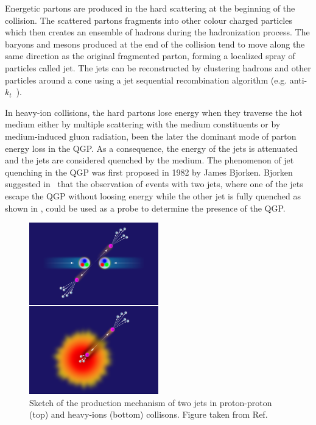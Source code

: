 Energetic partons are produced in the hard scattering at the beginning of the collision. The scattered partons fragments into other colour charged particles which then creates an ensemble of hadrons during the hadronization process. The baryons and mesons produced at the end of the collision tend to move along the same direction as the original fragmented parton, forming a localized spray of particles called jet. The jets can be reconstructed by clustering hadrons and other particles around a cone using a jet sequential recombination algorithm (e.g. anti-$k_{t}$~\cite{AntikT}).

In heavy-ion collisions, the hard partons lose energy when they traverse the hot medium either by multiple scattering with the medium constituents or by medium-induced gluon radiation, been the later the dominant mode of parton energy loss in the QGP. As a consequence, the energy of the jets is attenuated and the jets are considered quenched by the medium. The phenomenon of jet quenching in the QGP was first proposed in 1982 by James Bjorken. Bjorken suggested in~\cite{BjorkenJetQuenching} that the observation of events with two jets, where one of the jets escape the QGP without loosing energy while the other jet is fully quenched as shown in , could be used as a probe to determine the presence of the QGP.

\begin{figure}[!htbp]
 \begin{center}
  \includegraphics[width=0.5\textwidth]{Figures/Introduction/HeavyIons/JetQuenching.png}
 \end{center}
\caption{Sketch of the production mechanism of two jets in proton-proton (top) and heavy-ions (bottom) collisons. Figure taken from Ref.~\cite{FigureJetQuenching}}
 \label{fig:JetQuenching}
\end{figure}

